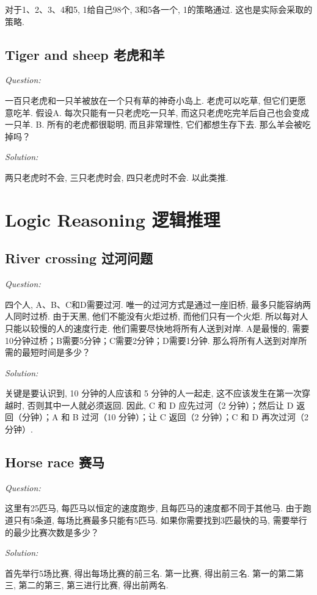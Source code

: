 \documentclass[12pt]{book}
\begin{document}
对于1、2、3、4和5, 1给自己98个, 3和5各一个, 1的策略通过. 这也是实际会采取的策略. 

\subsection{Tiger and sheep 老虎和羊}
\noindent \textit{Question:}

一百只老虎和一只羊被放在一个只有草的神奇小岛上. 老虎可以吃草, 但它们更愿意吃羊. 假设A. 每次只能有一只老虎吃一只羊, 而这只老虎吃完羊后自己也会变成一只羊. B. 所有的老虎都很聪明, 而且非常理性, 它们都想生存下去. 那么羊会被吃掉吗？

\noindent \textit{Solution:} 

两只老虎时不会, 三只老虎时会, 四只老虎时不会. 以此类推.

\section{Logic Reasoning 逻辑推理}
\subsection{River crossing 过河问题}
\noindent \textit{Question:}

四个人, A、B、C和D需要过河. 唯一的过河方式是通过一座旧桥, 最多只能容纳两人同时过桥. 由于天黑, 他们不能没有火炬过桥, 而他们只有一个火炬. 所以每对人只能以较慢的人的速度行走. 他们需要尽快地将所有人送到对岸. A是最慢的, 需要10分钟过桥；B需要5分钟；C需要2分钟；D需要1分钟. 那么将所有人送到对岸所需的最短时间是多少？

\noindent \textit{Solution:} 

关键是要认识到, 10 分钟的人应该和 5 分钟的人一起走, 这不应该发生在第一次穿越时, 否则其中一人就必须返回. 因此, C 和 D 应先过河（2 分钟）；然后让 D 返回（分钟）；A 和 B 过河（10 分钟）；让 C 返回（2 分钟）；C 和 D 再次过河（2 分钟）. 

\subsection{Horse race 赛马}
\noindent \textit{Question:}

这里有25匹马, 每匹马以恒定的速度跑步, 且每匹马的速度都不同于其他马. 由于跑道只有5条道, 每场比赛最多只能有5匹马. 如果你需要找到3匹最快的马, 需要举行的最少比赛次数是多少？

\noindent \textit{Solution:} 

首先举行5场比赛, 得出每场比赛的前三名. 第一比赛, 得出前三名. 第一的第二第三, 第二的第三, 第三进行比赛, 得出前两名.
\end{document}
